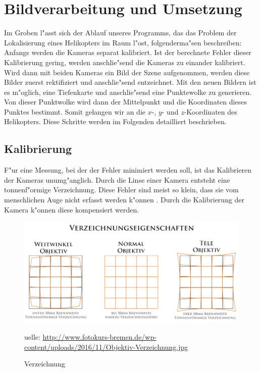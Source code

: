 \chapter{Bildverarbeitung und Umsetzung}
\label{cha:verarbeitungumsetzung}

Im Groben l"asst sich der Ablauf unseres Programms,
das das Problem der Lokalisierung eines Helikopters im Raum l"ost, folgenderma"sen beschreiben:\newline
Anfangs werden die Kameras separat kalibriert. Ist der berechnete Fehler dieser Kalibrierung gering, werden anschlie"send die Kameras zu einander kalibriert. Wird dann mit beiden Kameras ein Bild der Szene aufgenommen, werden diese Bilder zuerst rektifiziert und anschlie"send entzeichnet. Mit den neuen Bildern ist es m"oglich, eine Tiefenkarte und anschlie"send eine Punktewolke zu generieren. Von dieser Punktwolke wird dann der Mittelpunkt und die Koordinaten dieses Punktes bestimmt. Somit gelangen wir an die $x$-, $y$- und $z$-Koordinaten des Helikopters.\newline
Diese Schritte werden im Folgenden detailliert beschrieben.

\section{Kalibrierung}
\label{sec:kalibrierung}

F"ur eine Messung, bei der der Fehler minimiert werden soll, ist das Kalibrieren der Kameras unumg"anglich. Durch die Linse einer Kamera entsteht eine tonnenf"ormige Verzeichnung. Diese Fehler sind meist so klein, dass sie vom menschlichen Auge nicht erfasst werden k"onnen \cite{VZ} \cite{VZ1}. Durch die Kalibrierung der Kamera k"onnen diese kompensiert werden.\newline

\begin{figure}[H]
	\includegraphics[scale=0.45]{bilder/verzeichnung}
	\caption[Verzeichnung]{Verzeichnung}
	\label{fig:verzeichnung}
	\small  uelle: \url{http://www.fotokurs-bremen.de/wp-content/uploads/2016/11/Objektiv-Verzeichnung.jpg}
\end{figure}

